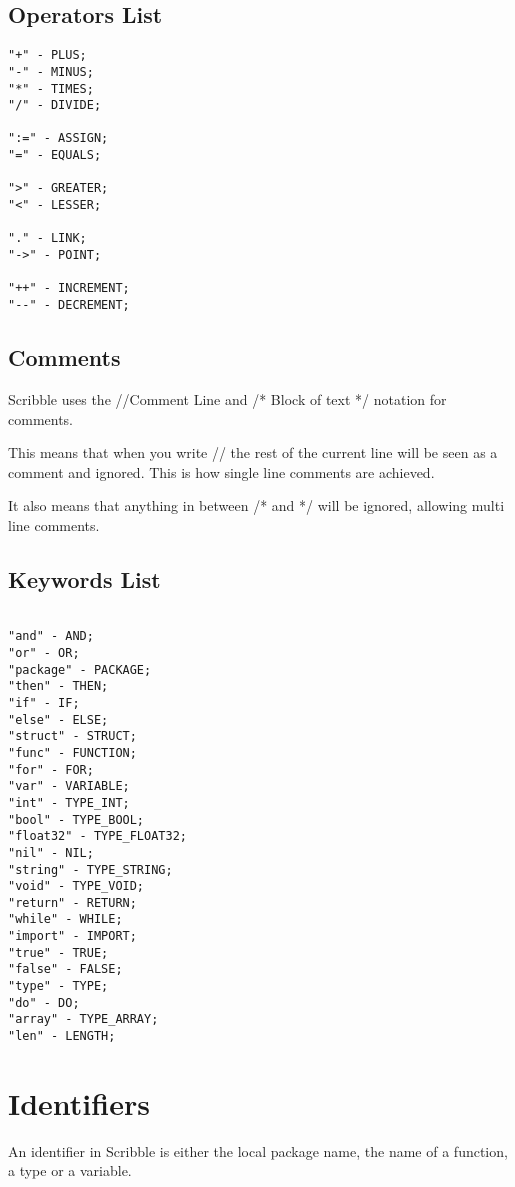 \documentclass[]{final_report}
\begin{document}
\section{Operators List}

\begin{verbatim}
"+" - PLUS;
"-" - MINUS;
"*" - TIMES;
"/" - DIVIDE;

":=" - ASSIGN;
"=" - EQUALS;

">" - GREATER;
"<" - LESSER;

"." - LINK;
"->" - POINT;

"++" - INCREMENT;
"--" - DECREMENT;
\end{verbatim}

\section{Comments}

Scribble uses the //Comment Line and /* Block of text */ notation for comments. 

This means that when you write // the rest of the current line will be seen as a comment and ignored. This is how single line comments are achieved.

It also means that anything in between /* and */ will be ignored, allowing multi line comments.

\section{Keywords List}

\begin{verbatim}

"and" - AND;
"or" - OR;
"package" - PACKAGE;
"then" - THEN;
"if" - IF;
"else" - ELSE;
"struct" - STRUCT;
"func" - FUNCTION;
"for" - FOR;
"var" - VARIABLE;
"int" - TYPE_INT;
"bool" - TYPE_BOOL;
"float32" - TYPE_FLOAT32;
"nil" - NIL;
"string" - TYPE_STRING;
"void" - TYPE_VOID;
"return" - RETURN;
"while" - WHILE;
"import" - IMPORT;
"true" - TRUE;
"false" - FALSE;
"type" - TYPE;
"do" - DO;
"array" - TYPE_ARRAY;
"len" - LENGTH;

\end{verbatim}

\chapter{Identifiers}

An identifier in Scribble is either the local package name, the name of a function, a type or a variable.
\end{document}
